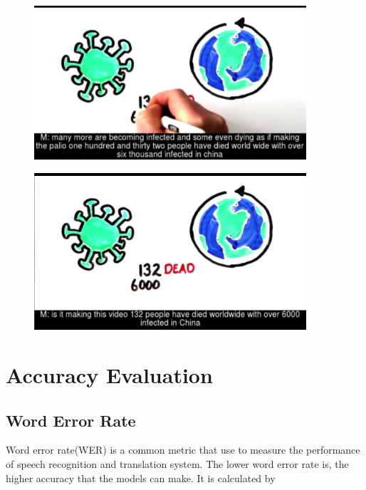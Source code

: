 \documentclass[natbib]{muthesis}
\begin{document}
 \begin{figure}[H]
 	\centering
 	\begin{minipage}{0.5\textwidth}
 		\centering
 		\includegraphics[width=0.9\textwidth]{images/example-video-ds} 
 		\label{fig:example-video-ds}
 	\end{minipage}\hfill
 	\begin{minipage}{0.5\textwidth}
 		\centering
 		\includegraphics[width=0.9\textwidth]{images/example-video-gws} 
		\label{fig:example-video-gws}
 	\end{minipage}
 \end{figure}

 
 \section{Accuracy Evaluation}
 
 
 \subsection{Word Error Rate}
 Word error rate(WER) is a common metric that use to measure the performance of speech recognition and translation system. The lower word error rate is, the higher accuracy that the models can make. It is calculated by
 
\end{document}

